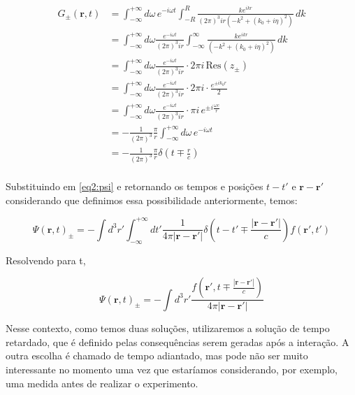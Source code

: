 \begin{equation}
	\begin{split}
		G_{\pm}(\mathbf{r},t) &= \int_{-\infty}^{+\infty} d\omega \, e^{-i\omega t} \int_{-R}^{R} \frac{ke^{ikr}}{(2\pi)^3 ir\left( -k^2 + (k_0+i\eta)^2\right)} \, dk \\
		&= \int_{-\infty}^{+\infty} d\omega \frac{e^{-i\omega t}}{(2\pi)^3 ir} \int_{-\infty}^{\infty} \frac{ke^{ikr}}{\left( -k^2 + (k_0+i\eta)^2\right)} \, dk \\
		&= \int_{-\infty}^{+\infty} d\omega \frac{e^{-i\omega t}}{(2\pi)^3 ir} \cdot 2\pi i \, \text{Res}(z_\pm) \\
		&= \int_{-\infty}^{+\infty} d\omega \frac{e^{-i\omega t}}{(2\pi)^3 ir} \cdot 2\pi i \cdot \frac{e^{\pm ik_0 r}}{2} \\
		&= \int_{-\infty}^{+\infty} d\omega \frac{e^{-i\omega t}}{(2\pi)^3 ir} \cdot \pi i \, e^{\pm i \frac{\omega c}{r}} \\
		&= -\frac{1}{(2\pi)^3} \frac{\pi}{r} \int_{-\infty}^{+\infty} d\omega \, e^{-i\omega t} \\
		&= -\frac{1}{(2\pi)^3} \frac{\pi}{r} \delta \left( t \mp \frac{r}{c} \right) \\
	\end{split}
\end{equation}

Substituindo em \ref{eq2:psi} e retornando os tempos e posições $t-t'$ e $\textbf{r}-\textbf{r}'$ considerando que definimos essa possibilidade anteriormente, temos:

\begin{equation}
	\Psi (\textbf{r}, t)_{\pm} = 
	-\int d^3 r' \int_{-\infty}^{+\infty} dt' \frac{1}{4\pi|\textbf{r}-\textbf{r}'|}\delta\left( t-t'\mp\frac{|\textbf{r}-\textbf{r}'|}{c}\right) f(\textbf{r}', t')
\end{equation}

Resolvendo para t,

\begin{equation}
	\Psi (\textbf{r}, t)_{\pm} = 
	-\int d^3 r'\frac{f(\textbf{r}', t\mp\frac{|\textbf{r}-\textbf{r}'|}{c})}{4\pi|\textbf{r}-\textbf{r}'|}
\end{equation}

Nesse contexto, como temos duas soluções, utilizaremos a solução de tempo retardado, que é definido pelas consequências serem geradas após a interação. A outra escolha é chamado de tempo adiantado, mas pode não ser muito interessante no momento uma vez que estaríamos considerando, por exemplo, uma medida antes de realizar o experimento.

